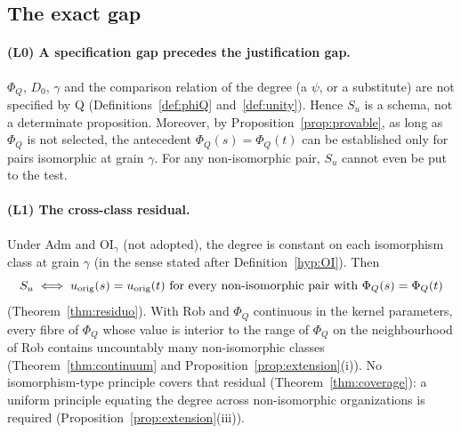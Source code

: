 \subsection{The exact gap}\label{sec:laguna}
\paragraph{(L0) A specification gap precedes the justification gap.} $\Phi_Q$, $D_0$, $\gamma$ and the comparison relation of the degree (a $\psi$, or a substitute) are not specified by Q (Definitions~\ref{def:phiQ} and~\ref{def:unity}). Hence $S_u$ is a schema, not a determinate proposition. Moreover, by Proposition~\ref{prop:provable}, as long as $\Phi_Q$ is not selected, the antecedent $\Phi_Q(s)=\Phi_Q(t)$ can be established only for pairs isomorphic at grain $\gamma$. For any non-isomorphic pair, $S_u$ cannot even be put to the test.

\paragraph{(L1) The cross-class residual.} Under Adm and OI$_\gamma$ (not adopted), the degree is constant on each isomorphism class at grain $\gamma$ (in the sense stated after Definition~\ref{hyp:OI}). Then
\begin{equation}
S_u\iff u_{\rm orig}(s)=u_{\rm orig}(t)\ \text{for every non-isomorphic pair with } \Phi_Q(s)=\Phi_Q(t)
\end{equation}
(Theorem~\ref{thm:residuo}). With Rob and $\Phi_Q$ continuous in the kernel parameters, every fibre of $\Phi_Q$ whose value is interior to the range of $\Phi_Q$ on the neighbourhood of Rob contains uncountably many non-isomorphic classes (Theorem~\ref{thm:continuum} and Proposition~\ref{prop:extension}(i)). No isomorphism-type principle covers that residual (Theorem~\ref{thm:coverage}): a uniform principle equating the degree across non-isomorphic organizations is required (Proposition~\ref{prop:extension}(iii)).

